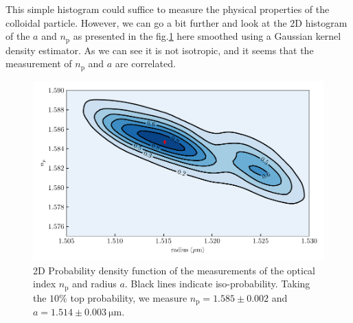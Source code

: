 This simple histogram could suffice to measure the physical properties of the colloidal particle. However, we can go a bit further and look at the 2D histogram of the $a$ and $n_\mathrm{p}$ as presented in the fig.\ref{fig:KDErn} here smoothed using a Gaussian kernel density estimator. As we can see it is not isotropic, and it seems that the measurement of $n_\mathrm{p}$ and $a$ are correlated.
 

\begin{figure}[h!]
	\centering
	\includegraphics{02_body/chapter2/images/KDErn.pdf}
	\caption{2D Probability density function of the measurements of the optical index $n_\mathrm{p}$ and radius $a$. Black lines indicate iso-probability. Taking the $10\% $ top probability, we measure $n_\mathrm{p} = 1.585 \pm 0.002$ and $a=1.514 \pm 0.003 ~ \mathrm{\mu m}$. }
	\label{fig:KDErn}
\end{figure}